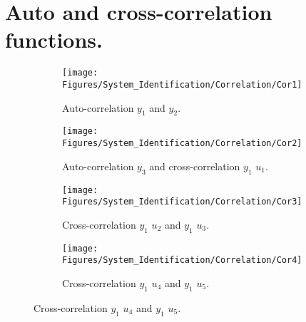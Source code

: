 \chapter{Auto and cross-correlation functions.}
\label{App:Correlation_Tests}
\begin{figure}[H]
\begin{center}
	\begin{subfigure}{0.49\textwidth} 	
    \texttt{[image: Figures/System\_Identification/Correlation/Cor1]}
    \caption{Auto-correlation $y_1$ and $y_2$.}
	\end{subfigure} 	
	\begin{subfigure}{0.49\textwidth}
    \texttt{[image: Figures/System\_Identification/Correlation/Cor2]}
    \caption{Auto-correlation $y_3$ and cross-correlation $y_1$ $u_1$.}
	\end{subfigure}
\end{center}
\begin{center}
	\begin{subfigure}{0.49\textwidth} 	
    \texttt{[image: Figures/System\_Identification/Correlation/Cor3]}
    \caption{Cross-correlation $y_1$ $u_2$ and $y_1$ $u_3$.}
	\end{subfigure} 	
	\begin{subfigure}{0.49\textwidth}
    \texttt{[image: Figures/System\_Identification/Correlation/Cor4]}
    \caption{Cross-correlation $y_1$ $u_4$ and $y_1$ $u_5$.}
	\end{subfigure}
\end{center}
\end{figure}
